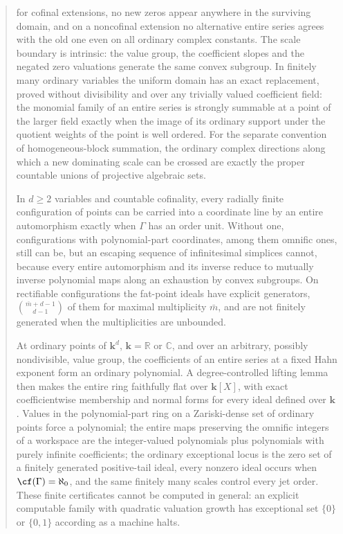 \documentclass[11pt]{article}
\theoremstyle{plain}
\theoremstyle{plain}
\theoremstyle{plain}
\theoremstyle{definition}
\theoremstyle{definition}
\theoremstyle{definition}
\theoremstyle{definition}
\theoremstyle{remark}
\newcommand{\C}{\mathbb C}\newcommand{\R}{\mathbb R}
\newcommand{\kk}{\mathbf k}\newcommand{\PP}{\mathbb P}
\begin{document}
\begin{abstract}
for cofinal extensions, no new zeros appear anywhere in the surviving
domain, and on a noncofinal extension no alternative entire series agrees
with the old one even on all ordinary complex constants. The scale boundary
is intrinsic: the value group, the coefficient slopes and the negated zero
valuations generate the same convex subgroup. In finitely many ordinary
variables the uniform domain has an exact replacement, proved without
divisibility and over any trivially valued coefficient field: the monomial
family of an entire series is strongly summable at a point of the larger
field exactly when the image of its ordinary support under the quotient
weights of the point is well ordered. For the separate convention of
homogeneous-block summation, the ordinary complex directions along which a
new dominating scale can be crossed are exactly the proper countable unions
of projective algebraic sets.

In $d\ge2$ variables and countable cofinality, every radially finite
configuration of points can be carried into a coordinate line by an entire
automorphism exactly when $\Gamma$ has an order unit. Without one,
configurations with polynomial-part coordinates, among them omnific ones,
still can be, but an escaping sequence of infinitesimal simplices cannot,
because every entire automorphism and its inverse reduce to mutually inverse
polynomial maps along an exhaustion by convex subgroups. On rectifiable
configurations the fat-point ideals have explicit generators,
$\binom{\bar m+d-1}{d-1}$ of them for maximal multiplicity $\bar m$, and are
not finitely generated when the multiplicities are unbounded.

At ordinary points of $\kk^d$, $\kk=\R$ or $\C$, and over an arbitrary,
possibly nondivisible, value group, the coefficients of an entire series at a
fixed Hahn exponent form an ordinary polynomial. A degree-controlled lifting
lemma then makes the entire ring faithfully flat over $\kk[X]$, with exact
coefficientwise membership and normal forms for every ideal defined over
$\kk$. Values in the polynomial-part ring on a Zariski-dense set of ordinary
points force a polynomial; the entire maps preserving the omnific integers of
a workspace are the integer-valued polynomials plus polynomials with purely
infinite coefficients; the ordinary exceptional locus is the zero set of a
finitely generated positive-tail ideal, every nonzero ideal occurs when
$\cf(\Gamma)=\aleph_0$, and the same finitely many scales control every jet
order. These finite certificates cannot be computed in general: an explicit
computable family with quadratic valuation growth has exceptional set $\{0\}$
or $\{0,1\}$ according as a machine halts.


\end{abstract}
\end{document}
